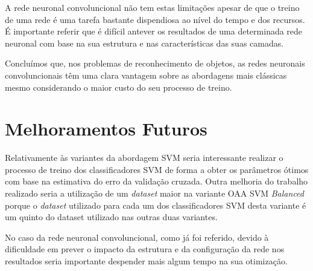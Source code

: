 \documentclass[extendedabs]{vcom}
\begin{document}
A rede neuronal convoluncional não tem estas limitações apesar de que o treino de uma rede é uma tarefa bastante dispendiosa ao nível do tempo e dos recursos. É importante referir que é difícil antever os resultados de uma determinada rede neuronal com base na sua estrutura e nas características das suas camadas.

Concluímos que, nos problemas de reconhecimento de objetos, as redes neuronais convoluncionais têm uma clara vantagem sobre as abordagens mais clássicas mesmo considerando o maior custo do seu processo de treino.

\section{Melhoramentos Futuros}
Relativamente às variantes da abordagem SVM seria interessante realizar o processo de treino dos classificadores SVM de forma a obter os parâmetros ótimos com base na estimativa do erro da validação cruzada. Outra melhoria do trabalho realizado seria a utilização de um \textit{dataset} maior na variante OAA SVM \textit{Balanced} porque o \textit{dataset} utilizado para cada um dos classificadores SVM desta variante é um quinto do dataset utilizado nas outras duas variantes. 

No caso da rede neuronal convoluncional, como já foi referido, devido à dificuldade em prever o impacto da estrutura e da configuração da rede nos resultados seria importante despender mais algum tempo na sua otimização.  

\nocite{*}


\end{document}
